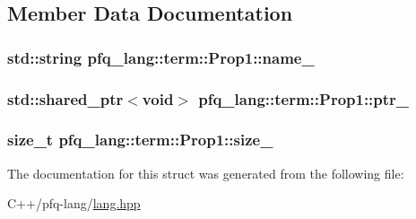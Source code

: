 \subsection{Member Data Documentation}
\hypertarget{structpfq__lang_1_1term_1_1Prop1_a6f58d98255a7efcbda41f708e761cdae}{
\subsubsection[{name\+\_\+}]{\setlength{\rightskip}{0pt plus 5cm}std\+::string pfq\+\_\+lang\+::term\+::\+Prop1\+::name\+\_\+}}\label{structpfq__lang_1_1term_1_1Prop1_a6f58d98255a7efcbda41f708e761cdae}
\hypertarget{structpfq__lang_1_1term_1_1Prop1_a7f21a83de8fd325aba8850994ed92350}{
\subsubsection[{ptr\+\_\+}]{\setlength{\rightskip}{0pt plus 5cm}std\+::shared\+\_\+ptr$<$void$>$ pfq\+\_\+lang\+::term\+::\+Prop1\+::ptr\+\_\+}}\label{structpfq__lang_1_1term_1_1Prop1_a7f21a83de8fd325aba8850994ed92350}
\hypertarget{structpfq__lang_1_1term_1_1Prop1_a6146482a36d9a3ee6bd783d1204a414c}{
\subsubsection[{size\+\_\+}]{\setlength{\rightskip}{0pt plus 5cm}size\+\_\+t pfq\+\_\+lang\+::term\+::\+Prop1\+::size\+\_\+}}\label{structpfq__lang_1_1term_1_1Prop1_a6146482a36d9a3ee6bd783d1204a414c}


The documentation for this struct was generated from the following file\+:\begin{DoxyCompactItemize}
\item 
C++/pfq-\/lang/\hyperlink{lang_8hpp}{lang.\+hpp}\end{DoxyCompactItemize}
